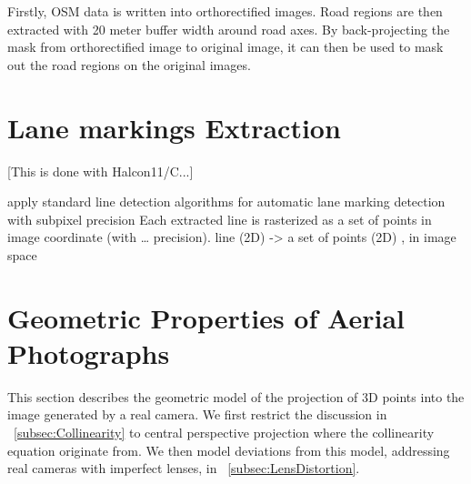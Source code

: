 Firstly, OSM data is written into orthorectified images. Road regions are then extracted with 20 meter buffer width around road axes. By back-projecting the mask from orthorectified image to original image, it can then be used to mask out the road regions on the original images.


\section{Lane markings Extraction}
\label{sec:LineExtraction}
[This is done with Halcon11/C...]

apply standard line detection algorithms for automatic lane marking detection
with subpixel precision
Each extracted line is rasterized as a set of points in image coordinate (with … precision).
line (2D) -> a set of points (2D) , in image space






\section{Geometric Properties of Aerial Photographs}
\label{sec:Geometry}

This section describes the geometric model of the projection of 3D points into the image generated by a real camera. We first restrict the discussion in ~\cref{subsec:Collinearity} to central perspective projection where the collinearity equation originate from. We then model deviations from this model, addressing real cameras with imperfect lenses, in ~\cref{subsec:LensDistortion}.

